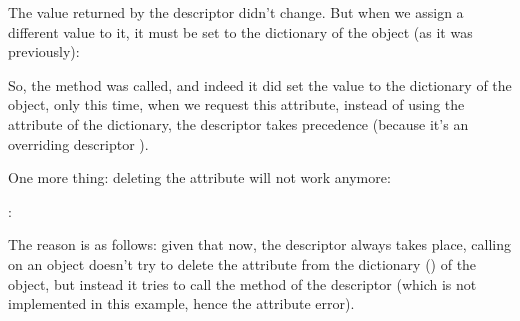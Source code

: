 \documentclass[a4paper,10pt,english]{sphinxmanual}
\begin{document}
\begin{sphinxVerbatim}[commandchars=\\\{\}]
  
\end{sphinxVerbatim}

The value returned by the descriptor didn’t change. But when we assign a different value
to it, it must be set to the dictionary of the object (as it was previously):

\begin{sphinxVerbatim}[commandchars=\\\{\}]
\PYG{p}{[}\PYG{p}{]}
\end{sphinxVerbatim}

So, the  method was called, and indeed it did set the value to the dictionary of
the object, only this time, when we request this attribute, instead of using the 
attribute of the dictionary, the descriptor takes precedence (because it’s an overriding
descriptor ).

One more thing: deleting the attribute will not work anymore:

\begin{sphinxVerbatim}[commandchars=\\\{\}]
 
: 
\end{sphinxVerbatim}

The reason is as follows: given that now, the descriptor always takes place, calling
 on an object doesn’t try to delete the attribute from the dictionary () of the
object, but instead it tries to call the  method of the descriptor (which is
not implemented in this example, hence the attribute error).
\end{document}
